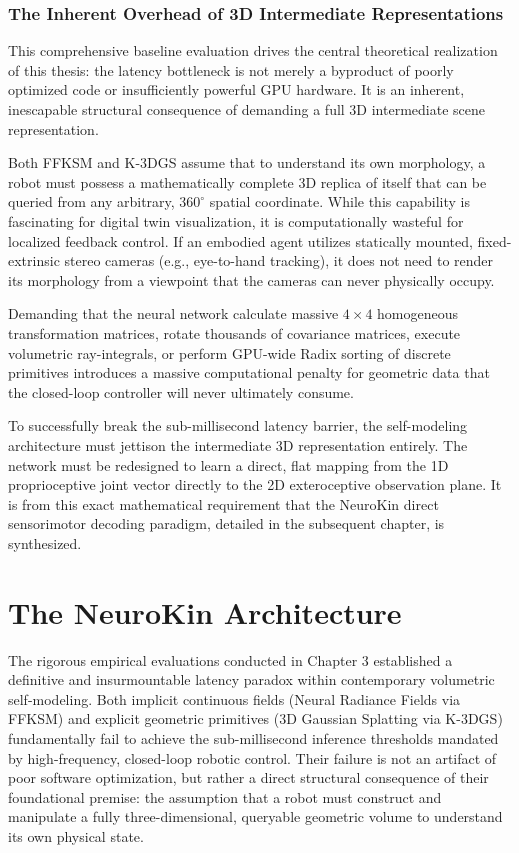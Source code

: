 \documentclass[12pt,a4paper,oneside]{report}
\begin{document}
\subsection{The Inherent Overhead of 3D Intermediate Representations}

This comprehensive baseline evaluation drives the central theoretical realization of this thesis: the latency bottleneck is not merely a byproduct of poorly optimized code or insufficiently powerful GPU hardware. It is an inherent, inescapable structural consequence of demanding a full 3D intermediate scene representation.

Both FFKSM and K-3DGS assume that to understand its own morphology, a robot must possess a mathematically complete 3D replica of itself that can be queried from any arbitrary, $360^\circ$ spatial coordinate. While this capability is fascinating for digital twin visualization, it is computationally wasteful for localized feedback control. If an embodied agent utilizes statically mounted, fixed-extrinsic stereo cameras (e.g., eye-to-hand tracking), it does not need to render its morphology from a viewpoint that the cameras can never physically occupy. 

Demanding that the neural network calculate massive $4 \times 4$ homogeneous transformation matrices, rotate thousands of covariance matrices, execute volumetric ray-integrals, or perform GPU-wide Radix sorting of discrete primitives introduces a massive computational penalty for geometric data that the closed-loop controller will never ultimately consume.

To successfully break the sub-millisecond latency barrier, the self-modeling architecture must jettison the intermediate 3D representation entirely. The network must be redesigned to learn a direct, flat mapping from the 1D proprioceptive joint vector directly to the 2D exteroceptive observation plane. It is from this exact mathematical requirement that the NeuroKin direct sensorimotor decoding paradigm, detailed in the subsequent chapter, is synthesized.

\chapter{The NeuroKin Architecture}

The rigorous empirical evaluations conducted in Chapter 3 established a definitive and insurmountable latency paradox within contemporary volumetric self-modeling. Both implicit continuous fields (Neural Radiance Fields via FFKSM) and explicit geometric primitives (3D Gaussian Splatting via K-3DGS) fundamentally fail to achieve the sub-millisecond inference thresholds mandated by high-frequency, closed-loop robotic control. Their failure is not an artifact of poor software optimization, but rather a direct structural consequence of their foundational premise: the assumption that a robot must construct and manipulate a fully three-dimensional, queryable geometric volume to understand its own physical state. 
\end{document}
